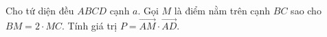 \begin{ex}
Cho tứ diện đều $ABCD$ cạnh $a$. Gọi $M$ là điểm nằm trên cạnh $BC$ sao cho $BM=2\cdot MC$. Tính giá trị $P=\overrightarrow{AM}\cdot\overrightarrow{AD}$.
\end{ex}
